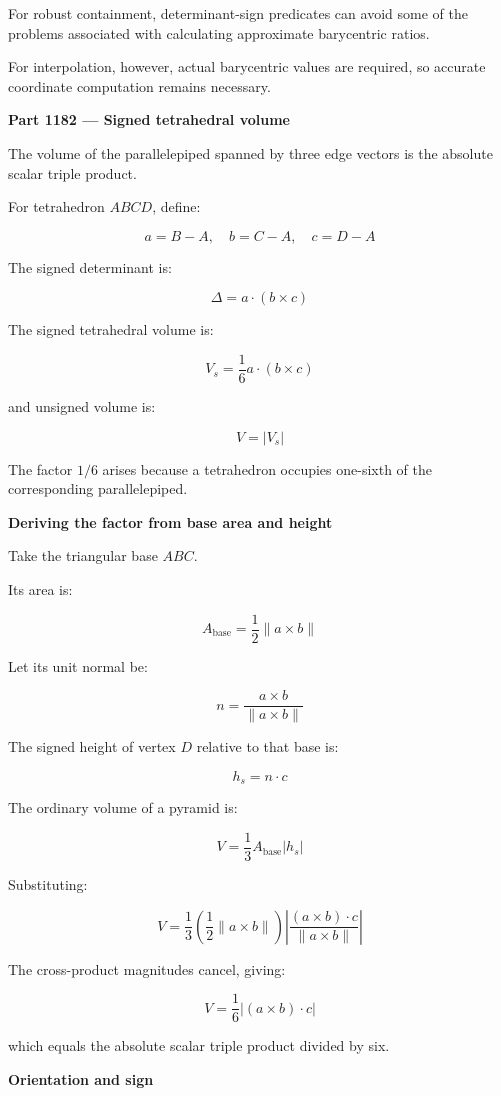 For robust containment, determinant-sign predicates can avoid some of the problems associated with calculating approximate barycentric ratios.

For interpolation, however, actual barycentric values are required, so accurate coordinate computation remains necessary.

\textbf{Part 1182 --- Signed tetrahedral volume}

The volume of the parallelepiped spanned by three edge vectors is the absolute scalar triple product.

For tetrahedron \(ABCD\), define:

\[
a=B-A,\quad b=C-A,\quad c=D-A
\]

The signed determinant is:

\[
\boxed{ \Delta=a\cdot(b\times c) }
\]

The signed tetrahedral volume is:

\[
\boxed{ V_s=\frac16a\cdot(b\times c) }
\]

and unsigned volume is:

\[
\boxed{ V=|V_s| }
\]

The factor \(1/6\) arises because a tetrahedron occupies one-sixth of the corresponding parallelepiped.

\textbf{Deriving the factor from base area and height}

Take the triangular base \(ABC\).

Its area is:

\[
A_{\mathrm{base}}= \frac12\|a\times b\|
\]

Let its unit normal be:

\[
n=\frac{a\times b}{\|a\times b\|}
\]

The signed height of vertex \(D\) relative to that base is:

\[
h_s=n\cdot c
\]

The ordinary volume of a pyramid is:

\[
V=\frac13A_{\mathrm{base}}|h_s|
\]

Substituting:

\[
V=\frac13\left(\frac12\|a\times b\|\right) \left|\frac{(a\times b)\cdot c}{\|a\times b\|}\right|
\]

The cross-product magnitudes cancel, giving:

\[
V=\frac16|(a\times b)\cdot c|
\]

which equals the absolute scalar triple product divided by six.

\textbf{Orientation and sign}

